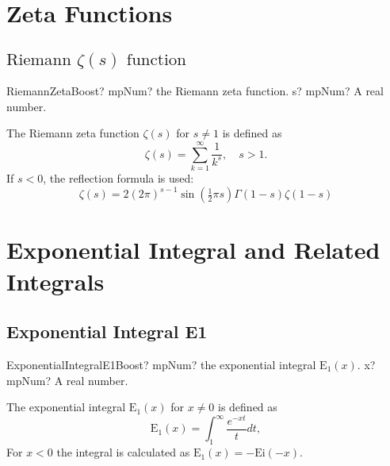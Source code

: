 \section{Zeta Functions}
\label{ZetaFunctionsBoost}

\subsection{\texorpdfstring{$\text{Riemann }\zeta(s)\text{ function}$}{RiemannZeta}}
\label{RiemannZetaBoost}


\begin{mpFunctionsExtract}
	\mpFunctionOne
	{RiemannZetaBoost? mpNum? the Riemann zeta function.}
	{s? mpNum? A real number.}
\end{mpFunctionsExtract}

\vspace{0.3cm}
The Riemann zeta function $\zeta(s)$ for $s \neq 1$ is defined as
\begin{equation}
	\zeta(s) = \sum_{k=1}^\infty \frac{1}{k^s}, \quad s>1.
\end{equation}
If $s<0$, the reflection formula is used:
\begin{equation}
	\zeta(s) = 2(2\pi)^{s-1} \sin\left(\tfrac{1}{2} \pi s\right) \Gamma(1-s) \zeta(1-s)
\end{equation}

\section{Exponential Integral and Related Integrals}


\subsection{Exponential Integral E1}
\label{Exponential Integral E1}

\begin{mpFunctionsExtract}
	\mpFunctionOne
	{ExponentialIntegralE1Boost? mpNum? the exponential integral $\text{E}_1(x)$.}
	{x? mpNum? A real number.}
\end{mpFunctionsExtract}

\vspace{0.3cm}
The exponential integral $\text{E}_1(x)$ for $x \neq 0$ is defined as
\begin{equation}
	\text{E}_1(x) =  \int_1^\infty \frac{e^{-xt}}{t} dt,
\end{equation}
For $x<0$ the integral is calculated as $\text{E}_1(x) = -\text{Ei}(-x)$. 




